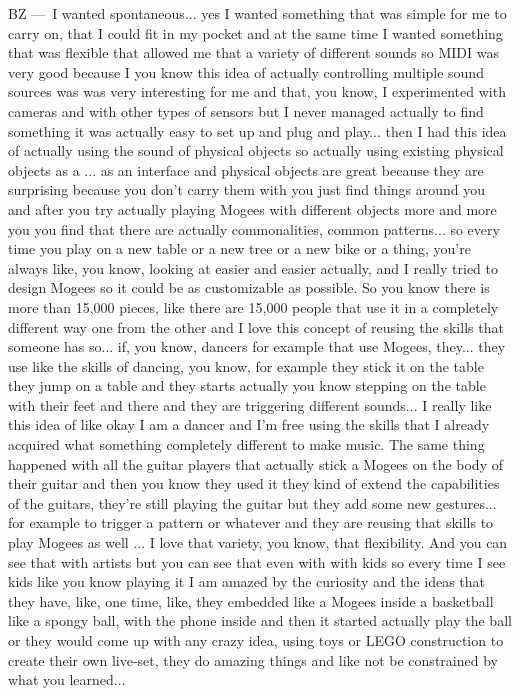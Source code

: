 BZ — I wanted spontaneous... yes I wanted something that was simple for me to carry on, that I could fit in my pocket and at the same time I wanted something that was flexible that allowed me that a variety of different sounds so MIDI was very good because I you know this idea of actually controlling multiple sound sources was was very interesting for me and that, you know, I experimented with cameras and with other types of sensors but I never managed actually to find something it was actually easy to set up and plug and play... then I had this idea of actually using the sound of physical objects so actually using existing physical objects as a ... as an interface and physical objects are great because they are surprising because you don't carry them with you just find things around you and after you try actually playing Mogees with different objects more and more you you find that there are actually commonalities, common patterns... so every time you play on a new table or a new tree or a new bike or a thing, you're always like, you know, looking at easier and easier actually, and I really tried to design Mogees so it could be as customizable as possible. So you know there is more than 15,000 pieces, like there are 15,000 people that use it in a completely different way one from the other and I love this concept of reusing the skills that someone has so... if, you know, dancers for example that use Mogees, they... they use like the skills of dancing, you know, for example they stick it on the table they jump on a table and they starts actually you know stepping on the table with their feet and there and they are triggering different sounds... I really like this idea of like okay I am a dancer and I'm free using the skills that I already acquired what something completely different to make music. The same thing happened with all the guitar players that actually stick a Mogees on the body of their guitar and then you know they used it they kind of extend the capabilities of the guitars, they're still playing the guitar but they add some new gestures... for example to trigger a pattern or whatever and they are reusing that skills to play Mogees as well ... I love that variety, you know, that flexibility. And you can see that with artists but you can see that even with with kids so every time I see kids like you know playing it I am amazed by the curiosity and the ideas that they have, like, one time, like, they embedded like a Mogees inside a basketball like a spongy ball, with the phone inside and then it started actually play the ball or they would come up with any crazy idea, using toys or LEGO construction to create their own live-set, they do amazing things and like not be constrained by what you learned...

